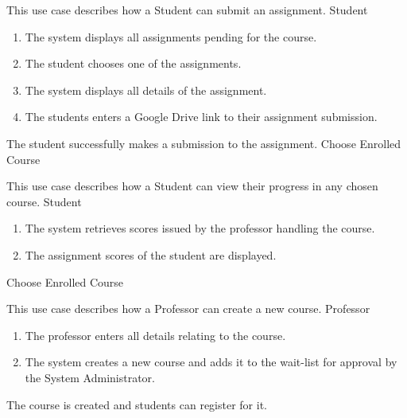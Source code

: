 \documentclass[12pt, a4]{report}
\begin{document}

\newpage
{}
{ %
This use case describes how a Student can submit an assignment.
}
{ %
Student
}
{ %
\begin{enumerate}
    \item The system displays all assignments pending for the course.
    \item The student chooses one of the assignments.
    \item The system displays all details of the assignment.
    \item The students enters a Google Drive link to their assignment submission.
\end{enumerate}
}
{ %
}
{ %
}
{ %
The student successfully makes a submission to the assignment.
}
{ %
Choose Enrolled Course
}
{ %
}


{ %
This use case describes how a Student can view their progress in any chosen course.
}
{ %
Student
}
{ %
\begin{enumerate}
    \item The system retrieves scores issued by the professor handling the course.
    \item The assignment scores of the student are displayed.
\end{enumerate}
}
{ %
}
{ %
}
{ %
}
{ %
Choose Enrolled Course
}
{ %
}


\newpage
{}
{ %
This use case describes how a Professor can create a new course.
}
{ %
Professor
}
{ %
\begin{enumerate}
    \item The professor enters all details relating to the course.
    \item The system creates a new course and adds it to the wait-list for approval by the System Administrator.
\end{enumerate}
}
{ %
}
{ %
}
{ %
The course is created and students can register for it.
}
{ %
}
{ %
}
\end{document}
